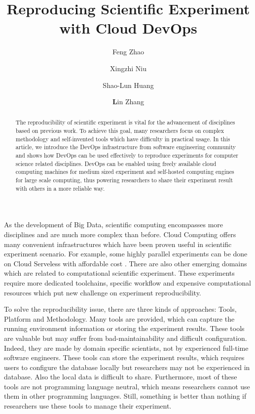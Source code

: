 \documentclass{IEEEcsmag}
\begin{document}

\title{Reproducing Scientific Experiment with Cloud DevOps}

\author{Feng Zhao}

\author{Xingzhi Niu}

\author{Shao-Lun Huang}

\author{\textbf{L}in Zhang}


\begin{abstract}
The reproducibility of scientific experiment is vital for the advancement of disciplines based on previous work. To achieve this goal, many researchers focus on complex methodology and self-invented tools which have difficulty in practical usage. In this article, we introduce the DevOps infrastructure from software engineering community and shows how DevOps can be used effectively to reproduce experiments for computer science related disciplines. DevOps can be enabled using freely available cloud computing machines for medium sized experiment and self-hosted computing engines for large scale computing, thus powering researchers to share their experiment result with others in a more reliable way.
\end{abstract}

\maketitle

 As the development of Big Data, scientific computing encompasses more disciplines and are much more complex than before. Cloud Computing offers many convenient infrastructures which have been proven useful in scientific experiment scenario.  For example, some highly parallel experiments can be done on Cloud Serveless with affordable cost \cite{niu2019leveraging}. There are also other emerging domains which are related to computational scientific experiment. These experiments require more dedicated toolchains, specific workflow and expensive computational resources which put new challenge on experiment reproducibility.

To solve the reproducibility issue, there are three kinds of approaches: Tools, Platform and Methodology. Many tools \cite{greff2017sacred} are provided, which can capture the running environment information or storing the experiment results. These tools are valuable but may suffer from bad-maintainability and difficult configuration. Indeed, they are made by domain specific scientists, not by experienced full-time software engineers. These tools can store the experiment results, which requires users to configure the database locally but researchers may not be experienced in database. Also the local data is difficult to share. Furthermore, most of these tools are not programming language neutral, which means researchers cannot use them in other programming languages. Still, something is better than nothing if researchers use these tools to manage their experiment.
\end{document}
